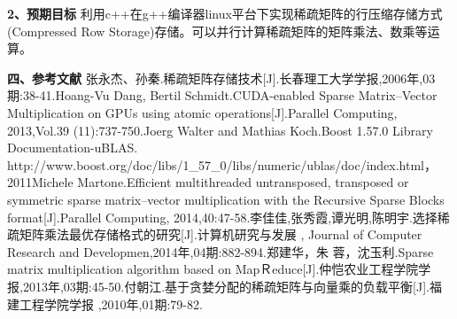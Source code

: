 \documentclass{article}
\begin{document}
     \textbf{2、预期目标}      \qquad
\newline
     利用c++在g++编译器linux平台下实现稀疏矩阵的行压缩存储方式(Compressed Row Storage)存储。可以并行计算稀疏矩阵的矩阵乘法、数乘等运算。
\newline
 
 \textbf{四、参考文献}
      \qquad
\newline
  [1]张永杰、孙秦.稀疏矩阵存储技术[J].长春理工大学学报,2006年,03期:38-41.\newline
      [2]Hoang-Vu Dang,  Bertil Schmidt.CUDA-enabled Sparse Matrix–Vector Multiplication on GPUs
using atomic operations[J].Parallel Computing, 2013,Vol.39 (11):737-750.\newline
  [3]Joerg Walter and Mathias Koch.Boost 1.57.0 Library Documentation-uBLAS. http://www.boost.org/doc/libs/1\_57\_0/libs/numeric/ublas/doc/index.html， 2011\newline
  [4]Michele Martone.Efficient multithreaded untransposed, transposed or symmetric sparse matrix–vector multiplication with the Recursive Sparse Blocks format[J].Parallel Computing, 2014,40:47-58.\newline
  [5]李佳佳,张秀霞,谭光明,陈明宇.选择稀疏矩阵乘法最优存储格式的研究[J].计算机研究与发展 , Journal of Computer Research and Developmen,2014年,04期:882-894.\newline
  [6]郑建华，朱 蓉，沈玉利.Sparse matrix multiplication algorithm based on MapＲeduce[J].仲恺农业工程学院学报,2013年,03期:45-50.\newline
[7]付朝江.基于贪婪分配的稀疏矩阵与向量乘的负载平衡[J].福建工程学院学报 ,2010年,01期:79-82.\newline

\end{document}

